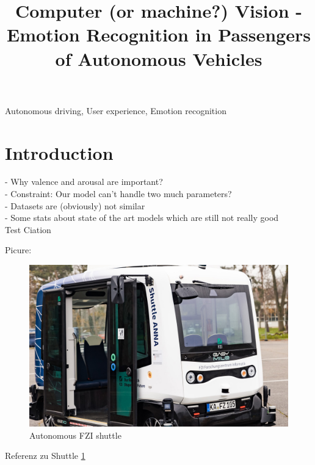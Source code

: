 \documentclass[conference]{IEEEtran}
\begin{document}
\title{Computer (or machine?) Vision - Emotion Recognition in
Passengers of Autonomous Vehicles}

\author{
    \and
    \and
}
\maketitle

\begin{abstract}
    \lipsum[2-4]
\end{abstract}

\begin{IEEEkeywords}
    Autonomous driving, User experience, Emotion recognition
\end{IEEEkeywords}

\section{Introduction}
 - Why valence and arousal are important? \\
 - Constraint: Our model can't handle two much parameters?\\
 - Datasets are (obviously) not similar \\
 - Some stats about state of the art models which are still not really good \\
 
Test Ciation \cite{test}

Picure:
\begin{figure}[ht]
    \centering
    \includegraphics[scale = 0.15]{pictures/Shuttle ganz.jpg}
    \caption{Autonomous FZI shuttle}
    \label{fig:Shuttle}
\end{figure}
Referenz zu Shuttle \ref{fig:Shuttle}
\newpage
\end{document}

